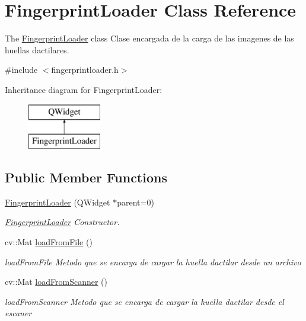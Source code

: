 \hypertarget{class_fingerprint_loader}{\section{Fingerprint\+Loader Class Reference}
\label{class_fingerprint_loader}
}


The \hyperlink{class_fingerprint_loader}{Fingerprint\+Loader} class Clase encargada de la carga de las imagenes de las huellas dactilares.  




{\ttfamily \#include $<$fingerprintloader.\+h$>$}

Inheritance diagram for Fingerprint\+Loader\+:\begin{figure}[H]
\begin{center}
\leavevmode
\includegraphics[height=2.000000cm]{class_fingerprint_loader}
\end{center}
\end{figure}
\subsection*{Public Member Functions}
\begin{DoxyCompactItemize}
\item 
\hyperlink{class_fingerprint_loader_a65cbd2252d3f732c934cd9812657a91c}{Fingerprint\+Loader} (Q\+Widget $\ast$parent=0)
\begin{DoxyCompactList}\small\item\em \hyperlink{class_fingerprint_loader}{Fingerprint\+Loader} Constructor. \end{DoxyCompactList}\item 
cv\+::\+Mat \hyperlink{class_fingerprint_loader_a39d7b63a1c6c6f6bd49310414f684cd1}{load\+From\+File} ()
\begin{DoxyCompactList}\small\item\em load\+From\+File Metodo que se encarga de cargar la huella dactilar desde un archivo \end{DoxyCompactList}\item 
cv\+::\+Mat \hyperlink{class_fingerprint_loader_a55a78ad38771cbec91d967a0a59c8ac3}{load\+From\+Scanner} ()
\begin{DoxyCompactList}\small\item\em load\+From\+Scanner Metodo que se encarga de cargar la huella dactilar desde el escaner \end{DoxyCompactList}\end{DoxyCompactItemize}


